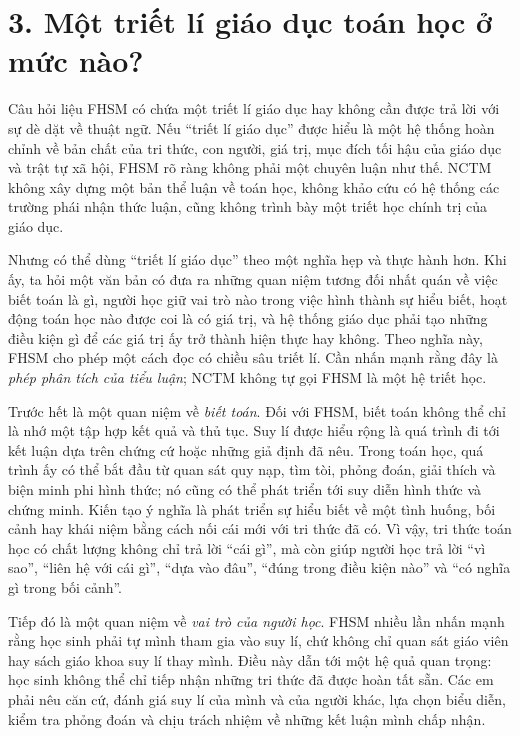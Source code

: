 {}
\section*{3. Một triết lí giáo dục toán học ở mức nào?}

Câu hỏi liệu FHSM có chứa một triết lí giáo dục hay không cần được trả lời với sự dè dặt về thuật ngữ. Nếu ``triết lí giáo dục'' được hiểu là một hệ thống hoàn chỉnh về bản chất của tri thức, con người, giá trị, mục đích tối hậu của giáo dục và trật tự xã hội, FHSM rõ ràng không phải một chuyên luận như thế. NCTM không xây dựng một bản thể luận về toán học, không khảo cứu có hệ thống
các trường phái nhận thức luận, cũng không trình bày một triết học chính trị của giáo dục.

Nhưng có thể dùng ``triết lí giáo dục'' theo một nghĩa hẹp và thực hành hơn. Khi ấy, ta hỏi một văn bản có đưa ra những quan niệm tương đối nhất quán về việc biết toán là gì, người học giữ vai trò nào trong việc hình thành sự hiểu biết, hoạt động toán học nào được coi là có giá trị, và hệ thống giáo dục phải tạo những điều kiện gì để các giá trị ấy trở thành hiện thực hay không. Theo nghĩa này, FHSM cho phép một cách đọc có chiều sâu triết lí. Cần nhấn mạnh rằng đây là \emph{phép phân tích của tiểu luận}; NCTM không tự gọi FHSM là một hệ triết học.

Trước hết là một quan niệm về \emph{biết toán}. Đối với FHSM, biết toán không thể chỉ là nhớ một tập hợp kết quả và thủ tục. Suy lí được hiểu rộng là quá trình đi tới kết luận dựa trên chứng cứ hoặc những giả định đã nêu. Trong toán học, quá trình ấy có thể bắt đầu từ quan sát quy nạp, tìm tòi, phỏng đoán, giải thích và biện minh phi hình thức; nó cũng có thể phát triển tới suy diễn hình thức và chứng minh. Kiến tạo ý nghĩa là phát triển sự hiểu biết về một tình huống, bối cảnh hay khái niệm bằng cách nối cái mới với tri thức đã có. Vì vậy, tri thức toán học có chất lượng không chỉ trả lời ``cái gì'', mà còn giúp người học trả lời ``vì sao'', ``liên hệ với cái gì'', ``dựa vào đâu'', ``đúng trong điều kiện nào'' và ``có nghĩa gì trong bối cảnh''.

Tiếp đó là một quan niệm về \emph{vai trò của người học}. FHSM nhiều lần nhấn mạnh rằng học sinh phải tự mình tham gia vào suy lí, chứ không chỉ quan sát giáo viên hay sách giáo khoa suy lí thay mình. Điều này dẫn tới một hệ quả quan trọng: học sinh không thể chỉ tiếp nhận những tri thức đã được hoàn tất sẵn. Các em phải nêu căn cứ, đánh giá suy lí của mình và của người khác, lựa chọn
biểu diễn, kiểm tra phỏng đoán và chịu trách nhiệm về những kết luận mình chấp nhận.

